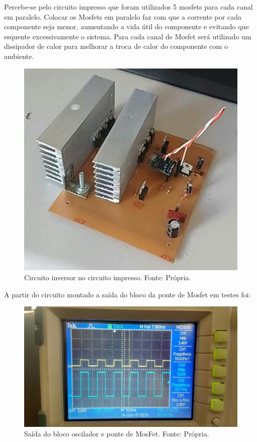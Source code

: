 				Percebe-se pelo circuito impresso que foram utilizados 5 mosfets para cada 						canal em paralelo. Colocar os Mosfets em paralelo faz com que a corrente por 					cada componente seja menor, aumentando a vida útil do componente e evitando 					que esquente excessivamente o sistema. Para cada canal de Mosfet será 							utilizado um dissipador de calor para melhorar a troca de calor do componente 					com o ambiente.		
		
                \begin{figure}[!htb]
            		\centering
            		\includegraphics[scale= 0.4]{figuras/Inversor_pronto.jpg}
            		\caption{Circuito inversor no circuito impresso. Fonte: Própria.}
            		\label{inversor-pronto}
            	\end{figure} 		
            	
            	A partir do circuito montado a saída do bloco da ponte de Mosfet em testes foi:
            	
                \begin{figure}[!htb]
            		\centering
            		\includegraphics[scale= 0.2]{figuras/saida_inversor.jpg}
            		\caption{Saída do bloco oscilador e ponte de MosFet. Fonte: Própria.}
            		\label{saida-inversor}
            	\end{figure}    
            	

